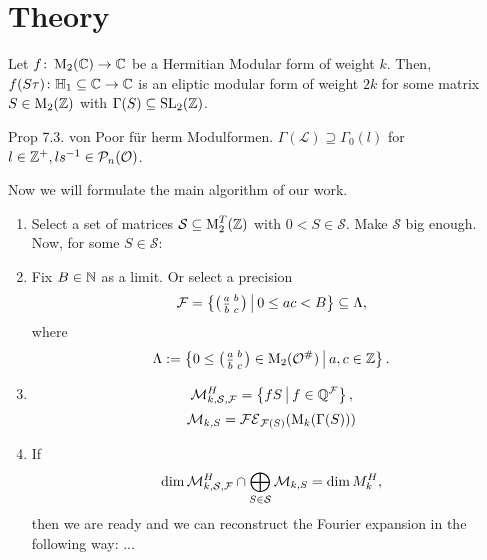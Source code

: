 
\section{Theory}


\begin{lemma}
Let $f \colon \operatorname{M}_2(\mathbb{C}) \rightarrow \mathbb{C}$ be a Hermitian Modular form of weight $k$.
Then, $f(S \tau) \colon \mathbb{H}_1 \subseteq \mathbb{C} \rightarrow \mathbb{C}$ is an eliptic modular form of weight $2k$ for some matrix $S \in \operatorname{M}_2(\mathbb{Z})$ with $\Gamma(S) \subseteq \operatorname{SL}_2(\mathbb{Z})$.
\end{lemma}


\begin{lemma}
Prop 7.3. von Poor für herm Modulformen.
$\Gamma(\mathcal{L}) \supseteq \Gamma_0(l)$ for $l \in \mathbb{Z}^+, ls^{-1} \in \mathcal{P}_n(\mathcal{O})$.
\end{lemma}


Now we will formulate the main algorithm of our work.

\begin{algo}
\begin{enumerate}
\item Select a set of matrices $\mathcal{S} \subseteq \operatorname{M}_2^T(\mathbb{Z})$ with $0 < S \in \mathcal{S}$. Make $\mathcal{S}$ big enough. Now, for some $S \in \mathcal{S}$:

\item Fix $B \in \mathbb{N}$ as a limit. Or select a precision
\[ \F = \Set{\SmallMatrix{a}{b}{\overline b}{c}}{0 \le a c < B} \subseteq \Lambda , \]
where
\[ \Lambda := \Set{0 \le \SmallMatrix{a}{b}{\overline b}{c} \in \M_2(\curlO^\#)}{a,c \in \Z } . \]

\item \[ \mathcal{M}_{k,\mathcal{S},\F}^H = \Set{f S}{f \in \Q^\F} , \]
\[ \mathcal{M}_{k,S} = \mathcal{FE}_{\mathcal{F}(S)}(\operatorname{M}_k(\Gamma(S))) \]

\item If
\[ \dim \mathcal{M}_{k,\mathcal{S},\mathcal{F}}^H \cap \bigoplus_{S \in \mathcal{S}} \mathcal{M}_{k,S}
= \dim M^H_k , \]
then we are ready and we can reconstruct the Fourier expansion in the following way: ...

\end{enumerate}
\end{algo}

